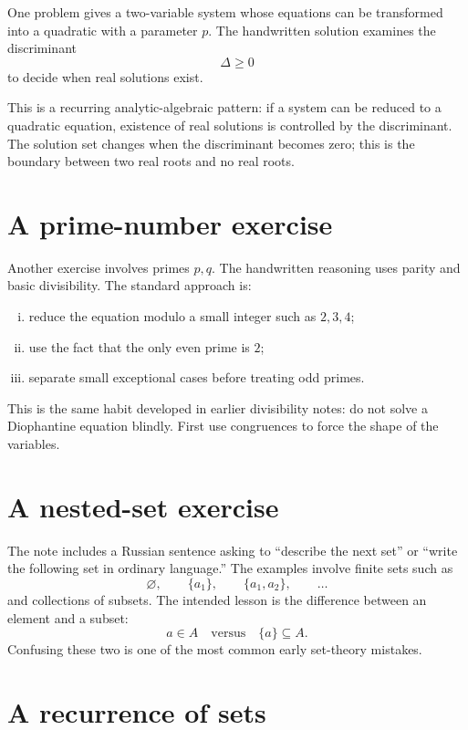 One problem gives a two-variable system whose equations can be transformed into a quadratic with a parameter \(p\).  The handwritten solution examines the discriminant
\[
  \Delta\ge0
\]
to decide when real solutions exist.

This is a recurring analytic-algebraic pattern: if a system can be reduced to a quadratic equation, existence of real solutions is controlled by the discriminant.  The solution set changes when the discriminant becomes zero; this is the boundary between two real roots and no real roots.

\section{A prime-number exercise}

Another exercise involves primes \(p,q\).  The handwritten reasoning uses parity and basic divisibility.  The standard approach is:
\begin{enumerate}[(i)]
  \item reduce the equation modulo a small integer such as \(2,3,4\);
  \item use the fact that the only even prime is \(2\);
  \item separate small exceptional cases before treating odd primes.

\end{enumerate}

This is the same habit developed in earlier divisibility notes: do not solve a Diophantine equation blindly.  First use congruences to force the shape of the variables.

\section{A nested-set exercise}

The note includes a Russian sentence asking to ``describe the next set'' or ``write the following set in ordinary language.''  The examples involve finite sets such as
\[
  \varnothing,\qquad \{a_1\},\qquad \{a_1,a_2\},\qquad\ldots
\]
and collections of subsets.  The intended lesson is the difference between an element and a subset:
\[
  a\in A\quad\text{versus}\quad \{a\}\subseteq A.
\]
Confusing these two is one of the most common early set-theory mistakes.

\section{A recurrence of sets}

